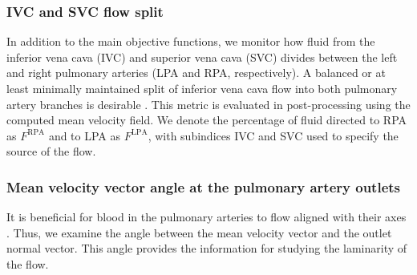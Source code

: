 \subsubsection*{IVC and SVC flow split}
In addition to the main objective functions, we monitor how fluid from the inferior vena cava (IVC) and superior vena cava (SVC) divides between the left and right pulmonary arteries  (LPA and RPA, respectively). A balanced or at least minimally maintained split of inferior vena cava flow into both pulmonary artery branches is desirable \cite{Rajagopal2021}. This metric is evaluated in post-processing using the computed mean velocity field. We denote the percentage of fluid directed to RPA as $F^{\text{RPA}}$ and to LPA as $F^{\text{LPA}}$, with subindices IVC and SVC used to specify the source of the flow.

\subsubsection*{Mean velocity vector angle at the pulmonary artery outlets}
It is beneficial for blood in the pulmonary arteries to flow aligned with their axes \cite{Rijnberg2018}. Thus, we examine the angle between the mean velocity vector and the outlet normal vector. This angle provides the information  for studying the laminarity of the flow.
